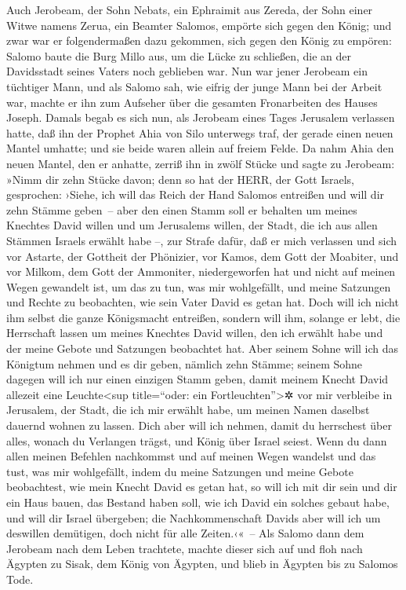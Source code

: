 Auch Jerobeam, der Sohn Nebats, ein Ephraimit aus Zereda,
der Sohn einer Witwe namens Zerua, ein Beamter Salomos, empörte sich
gegen den König; und zwar war er folgendermaßen dazu
gekommen, sich gegen den König zu empören: Salomo baute die Burg Millo
aus, um die Lücke zu schließen, die an der Davidsstadt seines Vaters
noch geblieben war. Nun war jener Jerobeam ein tüchtiger
Mann, und als Salomo sah, wie eifrig der junge Mann bei der Arbeit war,
machte er ihn zum Aufseher über die gesamten Fronarbeiten des Hauses
Joseph. Damals begab es sich nun, als Jerobeam eines
Tages Jerusalem verlassen hatte, daß ihn der Prophet Ahia von Silo
unterwegs traf, der gerade einen neuen Mantel umhatte; und sie beide
waren allein auf freiem Felde. Da nahm Ahia den neuen
Mantel, den er anhatte, zerriß ihn in zwölf Stücke und
sagte zu Jerobeam: »Nimm dir zehn Stücke davon; denn so hat der HERR,
der Gott Israels, gesprochen: ›Siehe, ich will das Reich der Hand
Salomos entreißen und will dir zehn Stämme geben~-- aber
den einen Stamm soll er behalten um meines Knechtes David willen und um
Jerusalems willen, der Stadt, die ich aus allen Stämmen Israels erwählt
habe --, zur Strafe dafür, daß er mich verlassen und sich
vor Astarte, der Gottheit der Phönizier, vor Kamos, dem Gott der
Moabiter, und vor Milkom, dem Gott der Ammoniter, niedergeworfen hat und
nicht auf meinen Wegen gewandelt ist, um das zu tun, was mir
wohlgefällt, und meine Satzungen und Rechte zu beobachten, wie sein
Vater David es getan hat. Doch will ich nicht ihm selbst
die ganze Königsmacht entreißen, sondern will ihm, solange er lebt, die
Herrschaft lassen um meines Knechtes David willen, den ich erwählt habe
und der meine Gebote und Satzungen beobachtet hat. Aber
seinem Sohne will ich das Königtum nehmen und es dir geben, nämlich zehn
Stämme; seinem Sohne dagegen will ich nur einen einzigen
Stamm geben, damit meinem Knecht David allezeit eine
Leuchte\textless sup title=``oder: ein Fortleuchten''\textgreater✲ vor
mir verbleibe in Jerusalem, der Stadt, die ich mir erwählt habe, um
meinen Namen daselbst dauernd wohnen zu lassen. Dich aber
will ich nehmen, damit du herrschest über alles, wonach du Verlangen
trägst, und König über Israel seiest. Wenn du dann allen
meinen Befehlen nachkommst und auf meinen Wegen wandelst und das tust,
was mir wohlgefällt, indem du meine Satzungen und meine Gebote
beobachtest, wie mein Knecht David es getan hat, so will ich mit dir
sein und dir ein Haus bauen, das Bestand haben soll, wie ich David ein
solches gebaut habe, und will dir Israel übergeben; die
Nachkommenschaft Davids aber will ich um deswillen demütigen, doch nicht
für alle Zeiten.‹«~-- Als Salomo dann dem Jerobeam nach
dem Leben trachtete, machte dieser sich auf und floh nach Ägypten zu
Sisak, dem König von Ägypten, und blieb in Ägypten bis zu Salomos Tode.

